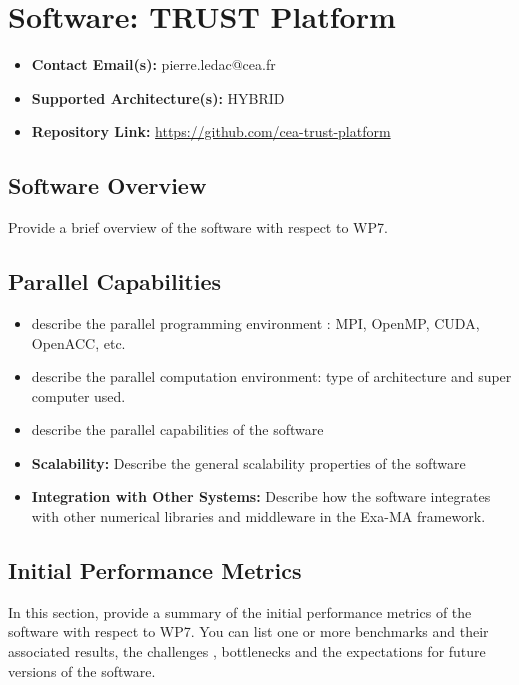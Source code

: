 \section{Software: TRUST Platform}
\label{sec:WP7:TRUST Platform:software}

\begin{itemize}
    \item \textbf{Contact Email(s):} pierre.ledac@cea.fr
    \item \textbf{Supported Architecture(s):} HYBRID
    \item \textbf{Repository Link:} \href{https://github.com/cea-trust-platform}{https://github.com/cea-trust-platform}
\end{itemize}

\subsection{Software Overview}
\label{sec:WP7:TRUST Platform:summary}

Provide a brief overview of the software with respect to WP7.

\subsection{Parallel Capabilities}
\label{sec:WP7:TRUST Platform:performances}


\begin{itemize}
    \item describe the parallel programming  environment : MPI, OpenMP, CUDA, OpenACC, etc.
    \item describe the parallel computation environment: type of architecture and super computer used.
    \item describe the parallel capabilities of the software
    \item \textbf{Scalability:} Describe the general scalability properties of the software
    \item \textbf{Integration with Other Systems:} Describe how the software integrates with other numerical libraries and middleware in the Exa-MA framework.
\end{itemize}

\subsection{Initial Performance Metrics}
\label{sec:WP7:TRUST Platform:metrics}

In this section, provide a summary of the initial performance metrics of the software with respect to WP7.
You can list one or more benchmarks and their associated results, the challenges , bottlenecks and the expectations for future versions of the software.



